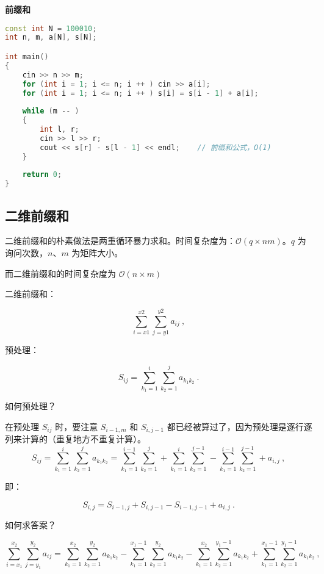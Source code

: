 \textbf{前缀和}
\begin{lstlisting}[language=cpp]
const int N = 100010;
int n, m, a[N], s[N];

int main() 
{
    cin >> n >> m;
    for (int i = 1; i <= n; i ++ ) cin >> a[i];
    for (int i = 1; i <= n; i ++ ) s[i] = s[i - 1] + a[i];
    
    while (m -- )
    {
        int l, r;
        cin >> l >> r;
        cout << s[r] - s[l - 1] << endl;    // 前缀和公式，O(1)
    }
    
    return 0;
}
\end{lstlisting}

\subsection{二维前缀和}

二维前缀和的朴素做法是两重循环暴力求和。时间复杂度为：$\mathcal{O}(q \times nm)$。$q$ 为询问次数，$n$、$m$ 为矩阵大小。

而二维前缀和的时间复杂度为 $\mathcal{O}(n \times m)$

二维前缀和：

\begin{equation}
\sum^{x2}_{i = x1}\sum^{y2}_{j = y1} a_{ij}~,
\end{equation}

预处理：

\begin{equation}
S_{ij} = \sum^{i}_{k_1 = 1} \sum^{j}_{k_2 = 1} a_{k_1 k_2}~.
\end{equation}

如何预处理？

在预处理 $S_{ij}$ 时，要注意 $S_{i - 1, m}$ 和 $S_{i, j - 1}$ 都已经被算过了，因为预处理是逐行逐列来计算的（重复地方不重复计算）。
\begin{equation}
S_{ij} = \sum^{i}_{k_1 = 1} \sum^{j}_{k_2 = 1} a_{k_1 k_2} = \sum^{i - 1}_{k_1 = 1} \sum^{j}_{k_2 = 1} + \sum^{i}_{k_1 = 1} \sum^{j - 1}_{k_2 = 1} - \sum^{i- 1}_{k_1 = 1} \sum^{j - 1}_{k_2 = 1} + a_{i, j}~,
\end{equation}

即：

\begin{equation}
S_{i, j} = S_{i - 1, j} + S_{i, j - 1} - S_{i - 1, j - 1} + a_{i, j}~.
\end{equation}

如何求答案？

\begin{equation}
\sum^{x_2}_{i = x_1}\sum^{y_2}_{j = y_1} a_{ij} = \sum^{x_2}_{k_1 = 1} \sum^{y_2}_{k_2 = 1} a_{k_1 k_2} - \sum^{x_1 - 1}_{k_1 = 1} \sum^{y_2}_{k_2 = 1} a_{k_1 k_2} - \sum^{x_2}_{k_1 = 1} \sum^{y_1 - 1}_{k_2 = 1} a_{k_1 k_2} + \sum^{x_1 - 1}_{k_1 = 1} \sum^{y_1 - 1}_{k_2 = 1} a_{k_1 k_2}~,
\end{equation}

